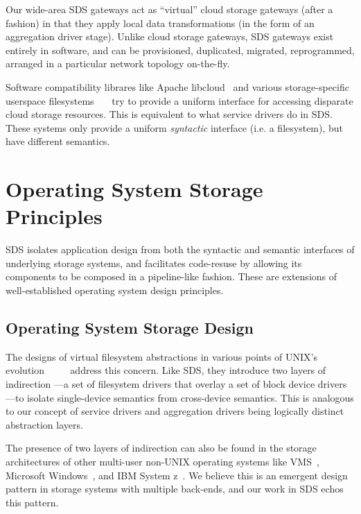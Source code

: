 Our wide-area SDS gateways act as ``virtual'' cloud storage gateways
(after a fashion) in that they apply local data transformations (in the form of
an aggregation driver stage).  Unlike cloud storage gateways, SDS gateways exist
entirely in software, and can be provisioned, duplicated, migrated,
reprogrammed, arranged in a particular network topology on-the-fly.

Software compatibility librares like Apache libcloud~\cite{libcloud} and various
storage-specific userspace
filesystems~\cite{s3fs}~\cite{dropbox-client}~\cite{google-drive-fs} try to
provide a uniform interface for accessing disparate cloud storage resources.
This is equivalent to what service drivers do in SDS.  These systems only provide a uniform
\emph{syntactic} interface (i.e. a filesystem), but have different semantics.

\section{Operating System Storage Principles}


SDS isolates application design from both the syntactic and semantic interfaces
of underlying storage systems, and facilitates code-resuse by allowing
its components to be composed in a pipeline-like fashion.  These are extensions of
well-established operating system design principles.

\subsection{Operating System Storage Design}

The designs of virtual filesystem abstractions in various points of UNIX's evolution
~\cite{vnodes-sun-1986}~\cite{netbsd4.4-vfs-1995}~\cite{plan9-filesystem}~\cite{freebsd-design-book}
address this concern.  Like SDS, they introduce two layers of indirection
---a set of filesystem drivers that overlay a set of block device drivers---to
isolate single-device semantics from cross-device semantics.  This is analogous
to our concept of service drivers and aggregation drivers being logically
distinct abstraction layers.

The presence of two layers of indirection can also be found in the storage
architectures of other multi-user non-UNIX
operating systems like VMS~\cite{vms-driver-model}, Microsoft
Windows~\cite{ms-windows-driver-model}, and IBM System z~\cite{ibm-vsams}.
We believe this is an emergent design pattern in storage systems with multiple
back-ends, and our work in SDS echos this pattern.

